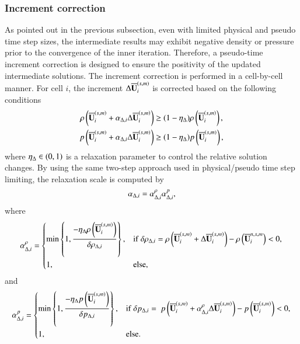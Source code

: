 \subsubsection{Increment correction}
\label{ssec:increment-correction}

As pointed out in the previous subsection, even with limited physical and pseudo time step sizes, the intermediate results may exhibit negative density or pressure prior to the convergence of the inner iteration.
Therefore, a pseudo-time increment correction is designed to ensure the positivity of the updated intermediate solutions. The increment correction is performed in a cell-by-cell manner.
For cell $i$, the increment $\mathrm\Delta \overline{\mathbf{U}}_i^{\left(s,m\right)}$ is corrected based on the following conditions
\begin{equation}
    \label{eq:ppLimitInc}
    \begin{aligned}
        \rho\left(\overline{\mathbf{U}}_i^{\left(s,m\right)} + \alpha_{\mathrm\Delta,i} \mathrm\Delta \overline{\mathbf{U}}_i^{\left(s,m\right)}\right)
         & \geq
        (1- \eta_\mathrm\Delta)
        \rho\left(\overline{\mathbf{U}}_i^{\left(s,m\right)}\right), \\
        p\left(\overline{\mathbf{U}}_i^{\left(s,m\right)} + \alpha_{\mathrm\Delta,i} \mathrm\Delta \overline{\mathbf{U}}_i^{\left(s,m\right)}\right)
         & \geq
        (1- \eta_\mathrm\Delta)
        p\left(\overline{\mathbf{U}}_i^{\left(s,m\right)}\right),
    \end{aligned}
\end{equation}
where $\eta_\mathrm\Delta \in (0,1)$ is a relaxation parameter to control the relative solution changes.
By using the same two-step approach used in physical/pseudo time step limiting, the relaxation scale is computed by
\begin{equation}
\label{eq:alpha-inc}
    \alpha_{\mathrm\Delta,i}= \alpha_{\mathrm\Delta,i}^{\rho} \alpha_{\mathrm\Delta,i}^{p},
\end{equation}
where
\begin{equation}
\label{eq:alpha-inc-rho}
    \alpha_{\mathrm\Delta,i}^{\rho} = \begin{dcases}
        \min\left\{1, \dfrac{-\eta_\mathrm\Delta \rho\left(\overline{\mathbf{U}}^{\left(s,m\right)}_i\right)}{\delta \rho_{\mathrm\Delta,i}} \right\}, & \mathrm{if} \ \delta \rho_{\mathrm\Delta,i} = \rho\left(\overline{\mathbf{U}}^{\left(s,m\right)}_i +\mathrm\Delta \overline{\mathbf{U}}_i^{\left(s,m\right)}\right)  -\rho\left(\overline{\mathbf{U}}^{n,s,m}_i\right) < 0, \\
        1, &
        \mathrm{else},
    \end{dcases}
\end{equation}
and
\begin{equation}
\label{eq:alpha-inc-p}
    \alpha_{\mathrm\Delta,i}^{p} = \begin{dcases}
        \min\left\{1, \dfrac{-\eta_\mathrm\Delta p \left(\overline{\mathbf{U}}^{\left(s,m\right)}_i\right)}{\delta p_{\mathrm\Delta,i}} \right\}, & \mathrm{if} \ \delta p_{\mathrm\Delta,i} = \ p \left(\overline{\mathbf{U}}^{\left(s,m\right)}_i + \alpha_{\mathrm\Delta,i}^{\rho} \mathrm\Delta \overline{\mathbf{U}}_i^{\left(s,m\right)}\right) - p \left(\overline{\mathbf{U}}^{\left(s,m\right)}_i\right) < 0, \\
        1, &
        \mathrm{else}.
    \end{dcases}
\end{equation}
